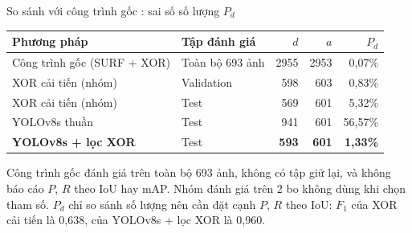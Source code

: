 \documentclass[aspectratio=169,11pt,t]{beamer}
\newcommand{\hl}[1]{{\bfseries\color{coral}#1}}
\newcommand{\hdr}[1]{{\bfseries\color{muted}#1}}
\begin{document}
\begin{frame}{So sánh với công trình gốc \cite{r1}: sai số số lượng \hl{$P_d$}}
  \footnotesize
  \renewcommand{\arraystretch}{1.3}\setlength{\tabcolsep}{5pt}
  \begin{tabular}{@{}L{4.4cm}L{3.5cm}rrr@{}}
    \toprule
    \hdr{Phương pháp} & \hdr{Tập đánh giá} & \hdr{$d$} & \hdr{$a$} & \hdr{$P_d$} \\
    \midrule
    Công trình gốc \cite{r1} (SURF + XOR) & Toàn bộ 693 ảnh & 2955 & 2953 & 0,07\% \\
    XOR cải tiến (nhóm) & Validation & 598 & 603 & 0,83\% \\
    XOR cải tiến (nhóm) & Test & 569 & 601 & 5,32\% \\
    YOLOv8s thuần & Test & 941 & 601 & 56,57\% \\
    \textbf{YOLOv8s + lọc XOR} & Test & \textbf{593} & \textbf{601} & \textbf{1,33\%} \\
    \bottomrule
  \end{tabular}
  \vspace{6pt}\par
  \begin{trap}
    \footnotesize Công trình gốc đánh giá trên toàn bộ 693 ảnh, không có tập giữ lại, và không báo cáo $P$, $R$ theo IoU hay mAP. Nhóm đánh giá trên 2 bo không dùng khi chọn tham số. $P_d$ chỉ so sánh số lượng nên cần đặt cạnh $P$, $R$ theo IoU: $F_1$ của XOR cải tiến là 0,638, của YOLOv8s + lọc XOR là 0,960.
  \end{trap}
\end{frame}
\end{document}
